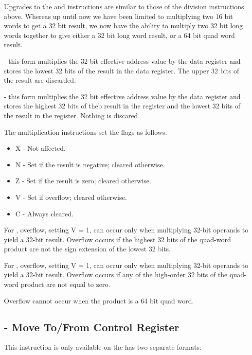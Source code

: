 Upgrades to the  and  instructions are similar to those of the division instructions above. Whereas up until now we have been limited to multiplying two 16 bit words to get a 32 bit result, we now have the ability to multiply two 32 bit long words together to give either a 32 bit long word result, or a 64 bit quad word result.

 - this form multiplies the 32 bit effective address value by the data register and stores the lowest 32 bits of the result in the data register. The upper 32 bits of the result are discarded.

 - this form multiplies the 32 bit effective address value by the data register and stores the highest 32 bits of theb result in the  register and the lowest 32 bits of the result in the  register. Nothing is discared.

The multiplication instructions set the flags as follows:

\begin{itemize}
    \item X - Not affected.
    \item N - Set if the result is negative; cleared otherwise.
    \item Z - Set if the result is zero; cleared otherwise.
    \item V - Set if overflow; cleared otherwise.
    \item C - Always cleared.
\end{itemize}

For , overflow, setting V = 1, can occur only when multiplying 32-bit
operands to yield a 32-bit result. Overflow occurs if the highest 32 bits of the quad-word product are not the sign extension of the lowest 32 bits.

For , overflow, setting V = 1, can occur only when multiplying 32-bit
operands to yield a 32-bit result. Overflow occurs if any of the high-order 32 bits of the quad-word product are not equal to zero.

Overflow cannot occur when the product is a 64 bit quad word.

\subsection{ - Move To/From Control Register}

This instruction is only available on the has two separate formats:

